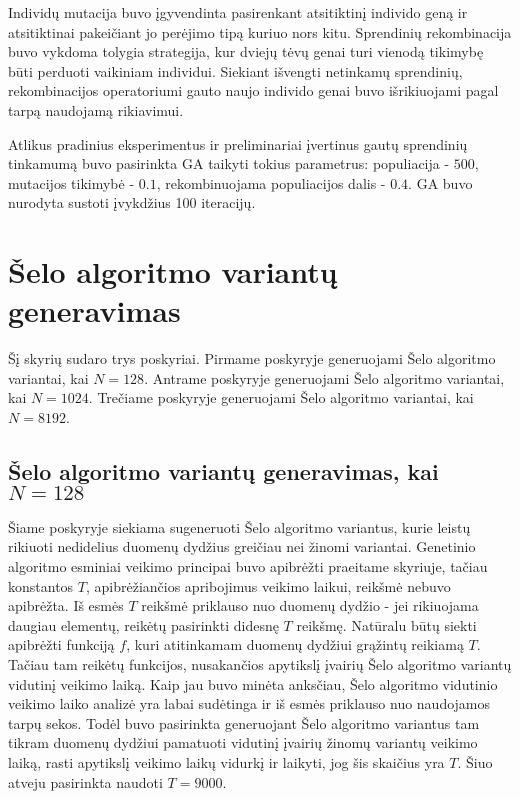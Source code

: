 \documentclass{VUMIFInfBakalaurinis}
\begin{document}

Individų mutacija buvo įgyvendinta pasirenkant atsitiktinį individo geną ir atsitiktinai pakeičiant jo perėjimo tipą kuriuo nors kitu.
Sprendinių rekombinacija buvo vykdoma tolygia strategija, kur dviejų tėvų genai turi vienodą tikimybę
būti perduoti vaikiniam individui.
Siekiant išvengti netinkamų sprendinių, rekombinacijos operatoriumi gauto naujo individo genai buvo išrikiuojami pagal tarpą naudojamą rikiavimui.

Atlikus pradinius eksperimentus ir preliminariai įvertinus gautų sprendinių tinkamumą buvo pasirinkta GA taikyti tokius parametrus:
populiacija - $500$, mutacijos tikimybė - $0.1$, rekombinuojama populiacijos dalis - $0.4$.
GA buvo nurodyta sustoti įvykdžius 100 iteracijų.




\section{Šelo algoritmo variantų generavimas}

Šį skyrių sudaro trys poskyriai.
Pirmame poskyryje generuojami Šelo algoritmo variantai, kai $N = 128$.
Antrame poskyryje generuojami Šelo algoritmo variantai, kai $N = 1024$.
Trečiame poskyryje generuojami Šelo algoritmo variantai, kai $N = 8192$.

\subsection{Šelo algoritmo variantų generavimas, kai $N = 128$}

Šiame poskyryje siekiama sugeneruoti Šelo algoritmo variantus,
kurie leistų rikiuoti nedidelius duomenų dydžius greičiau nei žinomi variantai.
Genetinio algoritmo esminiai veikimo principai buvo apibrėžti praeitame skyriuje, tačiau
konstantos $T$, apibrėžiančios apribojimus veikimo laikui, reikšmė nebuvo apibrėžta.
Iš esmės $T$ reikšmė priklauso nuo duomenų dydžio - jei rikiuojama daugiau elementų, reikėtų pasirinkti didesnę $T$ reikšmę.
Natūralu būtų siekti apibrėžti funkciją $f$, kuri atitinkamam duomenų dydžiui grąžintų reikiamą $T$.
Tačiau tam reikėtų funkcijos, nusakančios apytikslį įvairių Šelo algoritmo variantų vidutinį veikimo laiką.
Kaip jau buvo minėta anksčiau, Šelo algoritmo vidutinio veikimo laiko analizė yra labai sudėtinga ir iš esmės priklauso nuo naudojamos tarpų sekos.
Todėl buvo pasirinkta generuojant Šelo algoritmo variantus tam tikram duomenų dydžiui pamatuoti vidutinį įvairių žinomų variantų veikimo laiką,
rasti apytikslį veikimo laikų vidurkį ir laikyti, jog šis skaičius yra $T$. %
Šiuo atveju pasirinkta naudoti $T = 9000$.
\end{document}
